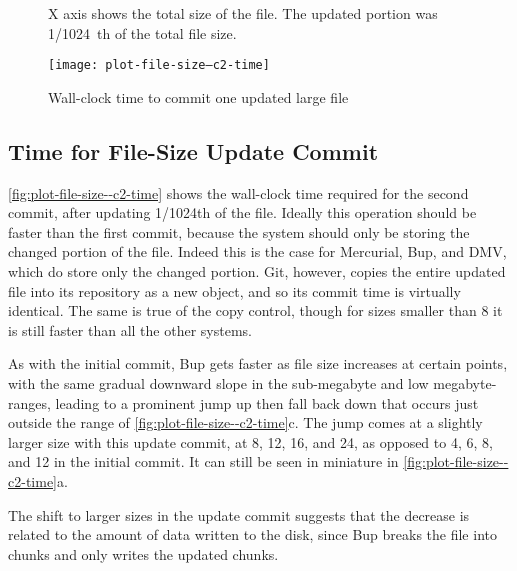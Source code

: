 %


\begin{figure}[p]
    \begin{leftfullpage}
        \caption{Wall-clock time to commit one updated large file}
        \label{fig:plot-file-size--c2-time}
        \centering

        X axis shows the total size of the file. The updated portion was
        \SI{1/1024}{th} of the total file size.
        \explainlogsubfig

        \texttt{[image: plot-file-size--c2-time]}
    \end{leftfullpage}
\end{figure}

\cleardoublepage

\subsection{Time for File-Size Update Commit}
\label{results-file-size--c2-time}

\autoref{fig:plot-file-size--c2-time} shows the wall-clock time required for the
second \gls{commit}, after updating \num{1/1024}th of the file. Ideally this
operation should be faster than the first \gls{commit}, because the system
should only be storing the changed portion of the file. Indeed this is the case
for Mercurial, Bup, and \gls{DMV}, which do store only the changed portion. Git,
however, copies the entire updated file into its \gls{repository} as a new
object, and so its \gls{commit} time is virtually identical. The same is true of
the copy control, though for sizes smaller than \SI{8}{\gib} it is still faster
than all the other systems.

As with the initial commit, Bup gets faster as file size increases at certain
points, with the same gradual downward slope in the sub-megabyte and low
megabyte-ranges, leading to a prominent jump up then fall back down that occurs
just outside the range of \autoref{fig:plot-file-size--c2-time}c. The jump comes
at a slightly larger size with this update commit, at \num{8}, \num{12},
\num{16}, and \SI{24}{\mib}, as opposed to \num{4}, \num{6}, \num{8}, and
\SI{12}{\mib} in the initial commit. It can still be seen in miniature in
\autoref{fig:plot-file-size--c2-time}a.

The shift to larger sizes in the update
commit suggests that the decrease is related to the amount of data written to
the disk, since Bup breaks the file into chunks and only writes the updated
chunks.

